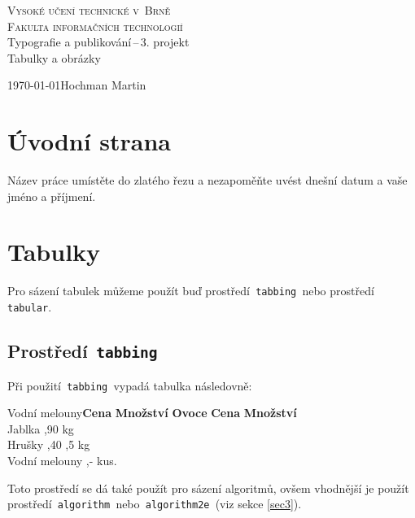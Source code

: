 \documentclass[11pt,a4paper]{article}
\begin{document}
\begin{titlepage}
\begin{center}
    \Huge{\textsc{Vysoké učení technické v~Brně \\}}
    \huge{\textsc{Fakulta informačních technologií \\}}
    \LARGE{Typografie a publikování\,--\,3. projekt\\}
    \Huge{Tabulky a obrázky}
\end{center}
{\Large \today \hfill Hochman Martin}
\end{titlepage}

\section{Úvodní strana}
Název práce umístěte do zlatého řezu a nezapoměňte uvést dnešní datum a vaše jméno a příjmení.

\section{Tabulky}
Pro sázení tabulek můžeme použít buď prostředí\texttt{ tabbing }nebo prostředí\texttt{ tabular}.

\subsection{Prostředí\texttt{ tabbing}}
Při použití\texttt{ tabbing }vypadá tabulka následovně:
\begin{tabbing}
  Vodní melouny\quad \=\textbf{Cena} \quad \= \textbf{Množství}  \quad  \kill
  \textbf{Ovoce}    \> \textbf{Cena}    \> \textbf{Množství}  \\
  Jablka            ,90             kg     \\
  Hrušky            ,40            ,5 kg   \\
  Vodní melouny     ,-              kus.   \\
\end{tabbing}

\noindent Toto prostředí se dá také použít pro sázení algoritmů, ovšem vhodnější je použít prostředí\texttt{ algorithm }nebo\texttt{ algorithm2e }(viz sekce \ref{sec3}).
\end{document}

